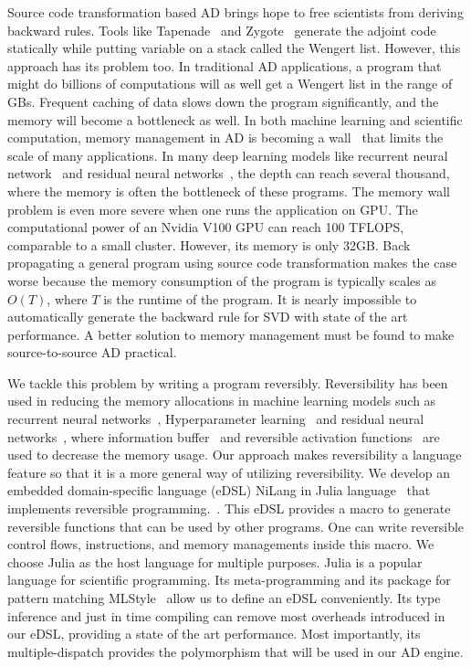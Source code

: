 \documentclass[aps,twocolumn,longbibliography,english,superscriptaddress]{revtex4-1}
\newcommand{\<}{\langle}
\renewcommand{\>}{\rangle}
\theoremstyle{definition}\newtheorem{definition}{\textit{Definition}}
\begin{document}
    Source code transformation based AD brings hope to free scientists from deriving backward rules.
    Tools like Tapenade~\cite{Hascoet2013} and Zygote~\cite{Innes2018, Innes2019} generate the adjoint code statically while putting variable on a stack called the Wengert list.
    However, this approach has its problem too. In traditional AD applications, a program that might do billions of computations will as well get a Wengert list in the range of GBs. Frequent caching of data slows down the program significantly, and the memory will become a bottleneck as well.
In both machine learning and scientific computation, memory management in AD is becoming a wall~\cite{Luo2019} that limits the scale of many applications.
In many deep learning models like recurrent neural network~\cite{Lipton2015} and residual neural networks~\cite{He2016}, the depth can reach several thousand, where the memory is often the bottleneck of these programs. The memory wall problem is even more severe when one runs the application on GPU. The computational power of an Nvidia V100 GPU can reach 100 TFLOPS, comparable to a small cluster. However, its memory is only 32GB.
Back propagating a general program using source code transformation makes the case worse because the memory consumption of the program is typically scales as $O(T)$, where $T$ is the runtime of the program. It is nearly impossible to automatically generate the backward rule for SVD with state of the art performance. A better solution to memory management must be found to make source-to-source AD practical.

    We tackle this problem by writing a program reversibly. Reversibility has been used in reducing the memory allocations in machine learning models such as recurrent neural networks~\cite{MacKay2018}, Hyperparameter learning~\cite{Maclaurin2015} and residual neural networks~\cite{Behrmann2018}, where information buffer~\cite{Maclaurin2015} and reversible activation functions~\cite{Gomez2017,Jacobsen2018} are used to decrease the memory usage.
    Our approach makes reversibility a language feature so that it is a more general way of utilizing reversibility.
    We develop an embedded domain-specific language (eDSL) NiLang in Julia language~\cite{Bezanson2012,Bezanson2017} that implements reversible programming.~\cite{Perumalla2013,Frank2017}. This eDSL provides a macro to generate reversible functions that can be used by other programs. One can write reversible control flows, instructions, and memory managements inside this macro.
We choose Julia as the host language for multiple purposes. Julia is a popular language for scientific programming. Its meta-programming and its package for pattern matching MLStyle~\cite{MLStyle} allow us to define an eDSL conveniently. Its type inference and just in time compiling can remove most overheads introduced in our eDSL, providing a state of the art performance. Most importantly, its multiple-dispatch provides the polymorphism that will be used in our AD engine.
\end{document}
